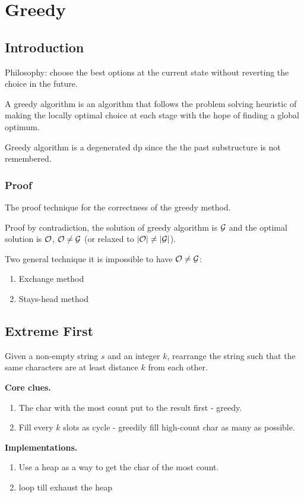 \chapter{Greedy}

\section{Introduction}
Philosophy: choose the best options at the current state without reverting the choice in the future. 

A greedy algorithm is an algorithm that follows the problem solving heuristic of making the locally optimal choice at each stage with the hope of finding a global optimum.

Greedy algorithm is a degenerated dp since the the past substructure is not remembered.

\subsection{Proof}
The proof technique for the correctness of the greedy method. 

Proof by contradiction, the solution of greedy algorithm is $\mathcal{G}$ and the optimal solution is $\mathcal{O}$, $\mathcal{O}\neq \mathcal{G}$ (or relaxed to $|\mathcal{O}|\neq |\mathcal{G}|$). 

Two general technique it is impossible to have $\mathcal{O}\neq \mathcal{G}$:
\begin{enumerate}
\item Exchange method 
\item Stays-head method 
\end{enumerate}

\section{Extreme First}
 Given a non-empty string $s$ and an integer $k$, rearrange the string such that the same characters are at least distance
$k$ from each other.

\textbf{Core clues.} 
\begin{enumerate}
\item The char with the most count put to the result first - greedy.
\item Fill every $k$ slots as cycle - greedily fill high-count char as many as possible.
\end{enumerate}

\textbf{Implementations.}
\begin{enumerate}
\item Use a heap as a way to get the char of the most count. 
\item {} loop till exhaust the heap
\end{enumerate}

